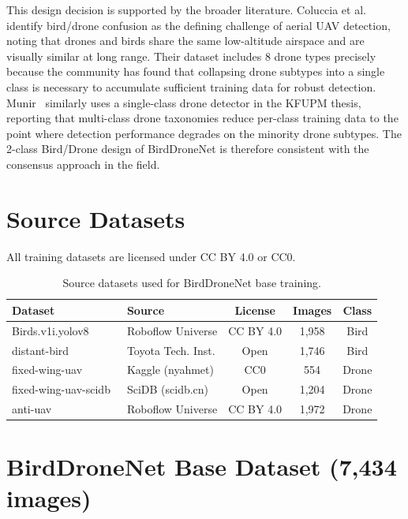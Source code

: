 \documentclass[12pt,a4paper]{report}
\renewcommand{\arraystretch}{1.1}
\begin{document}
This design decision is supported by the broader literature. Coluccia et al.~\cite{coluccia2021sensors}
identify bird/drone confusion as the defining challenge of aerial UAV detection,
noting that drones and birds share the same
low-altitude airspace and are visually similar at long range. Their dataset
includes 8 drone types precisely because the community has found that
collapsing drone subtypes into a single class is necessary to accumulate
sufficient training data for robust detection. Munir~\cite{munir2023kfupm}
similarly uses a single-class drone detector in the KFUPM thesis, reporting
that multi-class drone taxonomies reduce per-class training data to the point
where detection performance degrades on the minority drone subtypes. The
2-class Bird/Drone design of BirdDroneNet is therefore consistent with
the consensus approach in the field.

\section{Source Datasets}

All training datasets are licensed under CC BY 4.0 or CC0.

\begin{table}[H]
\centering
\caption[Source datasets for base training]{Source datasets used for BirdDroneNet base training.}
\label{tab:sources}
\renewcommand{\arraystretch}{0.9}
\begin{tabular}{|l|p{4.5cm}|c|c|c|}
\hline
\rowcolor{gray!20}
\textbf{Dataset} & \textbf{Source} & \textbf{License} & \textbf{Images} & \textbf{Class} \\
\hline
Birds.v1i.yolov8~\cite{birds_roboflow}   & Roboflow Universe  & CC BY 4.0  & 1,958 & Bird \\
\hline
distant-bird~\cite{fujii2021bird}        & Toyota Tech. Inst. & Open       & 1,746 & Bird \\
\hline
fixed-wing-uav~\cite{fixedwing_kaggle}   & Kaggle (nyahmet)   & CC0        & 554   & Drone \\
\hline
fixed-wing-uav-scidb~\cite{fixedwing_scidb} & SciDB (scidb.cn) & Open      & 1,204 & Drone \\
\hline
anti-uav~\cite{antiuav_roboflow}         & Roboflow Universe  & CC BY 4.0  & 1,972 & Drone \\
\hline
\end{tabular}
\end{table}

\section{BirdDroneNet Base Dataset (7,434 images)}
\label{sec:base_dataset}
\end{document}
